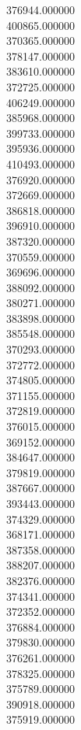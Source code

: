 376944.000000\\
400865.000000\\
370365.000000\\
378147.000000\\
383610.000000\\
372725.000000\\
406249.000000\\
385968.000000\\
399733.000000\\
395936.000000\\
410493.000000\\
376920.000000\\
372669.000000\\
386818.000000\\
396910.000000\\
387320.000000\\
370559.000000\\
369696.000000\\
388092.000000\\
380271.000000\\
383898.000000\\
385548.000000\\
370293.000000\\
372772.000000\\
374805.000000\\
371155.000000\\
372819.000000\\
376015.000000\\
369152.000000\\
384647.000000\\
379819.000000\\
387667.000000\\
393443.000000\\
374329.000000\\
368171.000000\\
387358.000000\\
388207.000000\\
382376.000000\\
374341.000000\\
372352.000000\\
376884.000000\\
379830.000000\\
376261.000000\\
378325.000000\\
375789.000000\\
390918.000000\\
375919.000000\\
